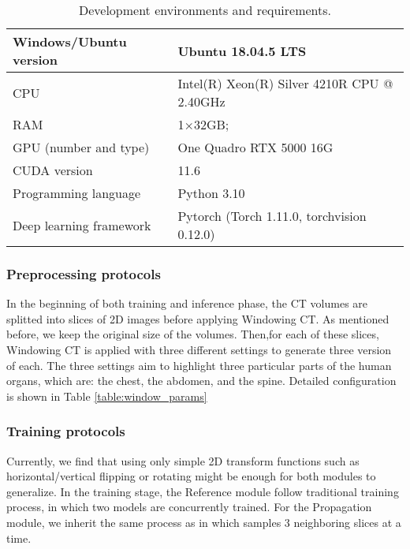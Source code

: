\begin{table}[!h]
\caption{Development environments and requirements.}\label{table:env}
\centering
\begin{tabular}{ll}
\hline
Windows/Ubuntu version       & Ubuntu 18.04.5 LTS\\
\hline
CPU   & Intel(R) Xeon(R) Silver 4210R CPU @ 2.40GHz \\
\hline
RAM                         &1$\times $32GB; \\
\hline
GPU (number and type)                         & One Quadro RTX 5000 16G\\
\hline
CUDA version                  & 11.6\\                          \hline
Programming language                 & Python 3.10\\ 
\hline
Deep learning framework & Pytorch (Torch 1.11.0, torchvision 0.12.0) \\

\hline
\end{tabular}
\end{table}

\vspace{-0.5cm}

\subsubsection{Preprocessing protocols}

In the beginning of both training and inference phase, the CT volumes are splitted into slices of 2D images before applying Windowing CT. As mentioned before, we keep the original size of the volumes. Then,for each of these slices, Windowing CT is applied with three different settings to generate three version of each. The three settings aim to highlight three particular parts of the human organs, which are: the chest, the abdomen, and the spine. Detailed configuration is shown in Table \ref{table:window_params}

\subsubsection{Training protocols}

Currently, we find that using only simple 2D transform functions such as horizontal/vertical flipping or rotating might be enough for both modules to generalize. In the training stage, the Reference module follow traditional training process, in which two models are concurrently trained. For the Propagation module, we inherit the same process as in \cite{stcn21cheng} which samples 3 neighboring slices at a time.

